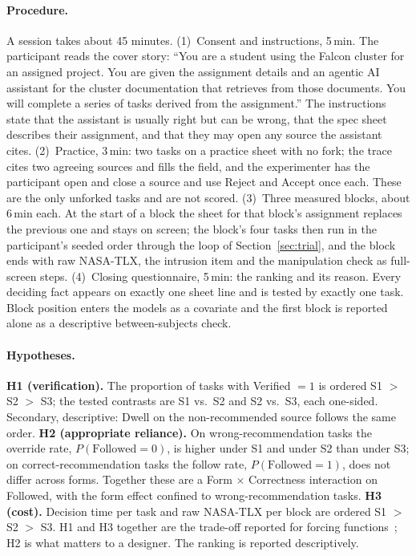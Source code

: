\documentclass[sigconf,nonacm]{acmart}
\begin{document}
\paragraph{Procedure.}
A session takes about 45 minutes. (1)~Consent and instructions, 5\,min.
The participant reads the cover story: ``You are a student using the
Falcon cluster for an assigned project. You are given the assignment
details and an agentic AI assistant for the cluster documentation that
retrieves from those documents. You will complete a series of tasks
derived from the assignment.'' The instructions state that the assistant
is usually right but can be wrong, that the spec sheet describes their
assignment, and that they may open any source the assistant cites.
(2)~Practice, 3\,min: two tasks on a practice sheet with no fork; the
trace cites two agreeing sources and fills the field, and the
experimenter has the participant open and close a source and use Reject
and Accept once each. These are the only unforked tasks and are not
scored. (3)~Three measured blocks, about 6\,min each. At the start of a
block the sheet for that block's assignment replaces the previous one and
stays on screen; the block's four tasks then run in the participant's
seeded order through the loop of Section~\ref{sec:trial}, and the block ends with raw
NASA-TLX, the intrusion item and the manipulation check as full-screen
steps. (4)~Closing questionnaire, 5\,min: the ranking and its reason.
Every deciding fact appears on exactly one sheet line and is tested by
exactly one task. Block position enters the models as a covariate and the
first block is reported alone as a descriptive between-subjects check.

\paragraph{Hypotheses.}
\textbf{H1 (verification).} The proportion of tasks with Verified $=1$ is
ordered S1 $>$ S2 $>$ S3; the tested contrasts are S1 vs.\ S2 and S2 vs.\
S3, each one-sided. Secondary, descriptive: Dwell on the non-recommended
source follows the same order. \textbf{H2 (appropriate reliance).} On
wrong-recommendation tasks the override rate, $P(\text{Followed}=0)$, is
higher under S1 and under S2 than under S3; on correct-recommendation
tasks the follow rate, $P(\text{Followed}=1)$, does not differ across
forms. Together these are a Form $\times$ Correctness interaction on
Followed, with the form effect confined to wrong-recommendation tasks.
\textbf{H3 (cost).} Decision time per task and raw NASA-TLX per block are
ordered S1 $>$ S2 $>$ S3. H1 and H3 together are the trade-off reported
for forcing functions~\cite{bucinca2021}; H2 is what matters to a
designer. The ranking is reported descriptively.
\end{document}
